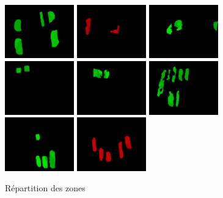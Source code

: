 \documentclass[a4paper,10pt]{report}
\begin{document}
\begin{figure}[htbp]
  \caption{Répartition des zones}
  \centering
  \includegraphics[width=3cm]{piece(1).jpg}
  \includegraphics[width=3cm]{piece(2).jpg}
  \includegraphics[width=3cm]{piece(3).jpg}
  \includegraphics[width=3cm]{piece(4).jpg}
  \includegraphics[width=3cm]{piece(5).jpg}
  \includegraphics[width=3cm]{piece(6).jpg}
  \includegraphics[width=3cm]{piece(7).jpg}
  \includegraphics[width=3cm]{piece(8).jpg}

\end{figure}
\end{document}
